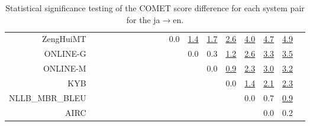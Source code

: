 \documentclass[11pt]{article}
\begin{document}
\begin{sidewaystable}
\begin{center}
{\begin{tabular}{rccccccccccccccccc}
ZengHuiMT &  &    &  &  &  &  &  &  &  & \cellcolor{red!0} 0.0 & \cellcolor{red!70} \underline{1.4} & \cellcolor{red!70} \underline{1.7} & \cellcolor{red!70} \underline{2.6} & \cellcolor{red!70} \underline{4.0} & \cellcolor{red!70} \underline{4.7} & \cellcolor{red!70} \underline{4.9}\\ 
ONLINE-G &    &  &  &  &  &  &  &  &  &  & \cellcolor{red!0} 0.0 & \cellcolor{red!0} 0.3 & \cellcolor{red!70} \underline{1.2} & \cellcolor{red!70} \underline{2.6} & \cellcolor{red!70} \underline{3.3} & \cellcolor{red!70} \underline{3.5}\\ 
ONLINE-M &    &  &  &  &  &  &  &  &  &  &  & \cellcolor{red!0} 0.0 & \cellcolor{red!70} \underline{0.9} & \cellcolor{red!70} \underline{2.3} & \cellcolor{red!70} \underline{3.0} & \cellcolor{red!70} \underline{3.2}\\ 
KYB &  &    &  &  &  &  &  &  &  &  &  &  & \cellcolor{red!0} 0.0 & \cellcolor{red!70} \underline{1.4} & \cellcolor{red!70} \underline{2.1} & \cellcolor{red!70} \underline{2.3}\\ 
NLLB\_MBR\_BLEU &  &    &  &  &  &  &  &  &  &  &  &  &  & \cellcolor{red!0} 0.0 & \cellcolor{red!60} 0.7 & \cellcolor{red!70} \underline{0.9}\\ 
AIRC &  &    &  &  &  &  &  &  &  &  &  &  &  &  & \cellcolor{red!0} 0.0 & \cellcolor{red!0} 0.2\\ 
\bottomrule 
\end{tabular}}
\caption{Statistical significance testing of the COMET score difference for each system pair for the ja$\rightarrow$en.} 
 \end{center} \end{sidewaystable} 
\end{document}
